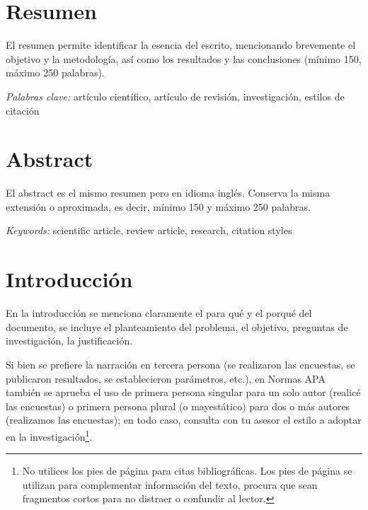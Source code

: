 \markright{\mititulo \hspace{5cm} \thepage}
\pagestyle{fancy}
\section*{Resumen}

\noindent El resumen permite identificar la esencia del escrito, mencionando brevemente el objetivo y la metodología, así como los resultados y las conclusiones (mínimo 150, máximo 250 palabras).

\vspace{1cm}\textit{Palabras clave:} artículo científico, artículo de revisión, investigación, estilos de citación


\newpage

\section*{Abstract}

\noindent El abstract es el mismo resumen pero en idioma inglés. Conserva la misma extensión o aproximada, es decir, mínimo 150 y máximo 250 palabras.



\vspace{1cm}\textit{Keywords:} scientific article, review article, research, citation styles

\newpage


\section*{Introducción}

En la introducción se menciona claramente el para qué y el porqué del documento, se incluye el planteamiento del problema, el objetivo, preguntas de investigación, la justificación.

Si bien se prefiere la narración en tercera persona (se realizaron las encuestas, se publicaron resultados, se establecieron parámetros, etc.), en Normas APA también se aprueba el uso de primera persona singular para un solo autor (realicé las encuestas) o primera persona plural (o mayestático) para dos o más autores (realizamos las encuestas); en todo caso, consulta con tu asesor el estilo a adoptar en la investigación\footnote{No utilices los pies de página para citas bibliográficas. Los pies de página se utilizan para complementar información del texto, procura que sean fragmentos cortos para no distraer o confundir al lector.}.

